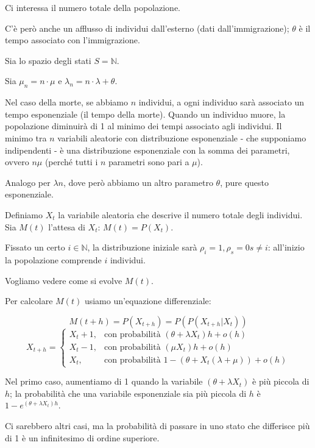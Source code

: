 \documentclass[a4paper,12pt]{book}
\begin{document}
Ci interessa il numero totale della popolazione. 

C'è però anche un afflusso di individui dall'esterno (dati dall'immigrazione); $\theta$ è il tempo associato con l'immigrazione. 

Sia lo spazio degli stati $ S = \mathbb{N} $. 

Sia $\mu_n = n\cdot \mu$ 
 e $\lambda_n = n\cdot \lambda + \theta$.
 
 Nel caso della morte, se abbiamo $ n $ individui, a ogni individuo sarà associato un tempo esponenziale (il tempo della morte). Quando un individuo muore, la popolazione diminuirà di 1 al minimo dei tempi associato agli individui. Il minimo tra $ n $ variabili aleatorie con distribuzione esponenziale - che supponiamo indipendenti - è una distribuzione esponenziale con la somma dei parametri, ovvero $ n\mu $ (perché tutti i $ n $ parametri sono pari a $ \mu $).
 
Analogo per $\lambda n$, dove però abbiamo un altro parametro $\theta$, pure questo esponenziale. 
 
 Definiamo $ X_t $ la variabile aleatoria che descrive il numero totale degli individui. Sia $ M(t) $ l'attesa di $ X_t $: $ M(t) = P(X_t) $.
 
 Fissato un certo $ i \in \mathbb{N} $, la distribuzione iniziale sarà $ \rho_i = 1, \rho_s = 0 s\ne i $: all'inizio la popolazione comprende $ i $ individui. 
 
 Vogliamo vedere come si evolve $ M(t) $. 
 
 Per calcolare $ M(t) $ usiamo un'equazione differenziale:
 
	$$ M(t+h) = P(X_{t+h}) = P(P(X_{t+h} | X_t))$$
	$$ X_{t+h} = \begin{cases}
		X_t + 1, & \text{con probabilità } (\theta + \lambda X_t)h + o(h) \\
		X_t-1, & \text{con probabilità } (\mu X_t)h + o(h) \\
		X_t, & \text{con probabilità } 1 - (\theta + X_t(\lambda + \mu)) + o(h)
	\end{cases} $$ 

Nel primo caso, aumentiamo di 1 quando la variabile $ (\theta + \lambda X_t) $ è più piccola di $ h $; la probabilità che una variabile esponenziale sia più piccola di $ h $ è $ 1 - e^{(\theta + \lambda X_t)h} $.

Ci sarebbero altri casi, ma la probabilità di passare in uno stato che differisce più di 1 è un infinitesimo di ordine superiore.
\end{document}

